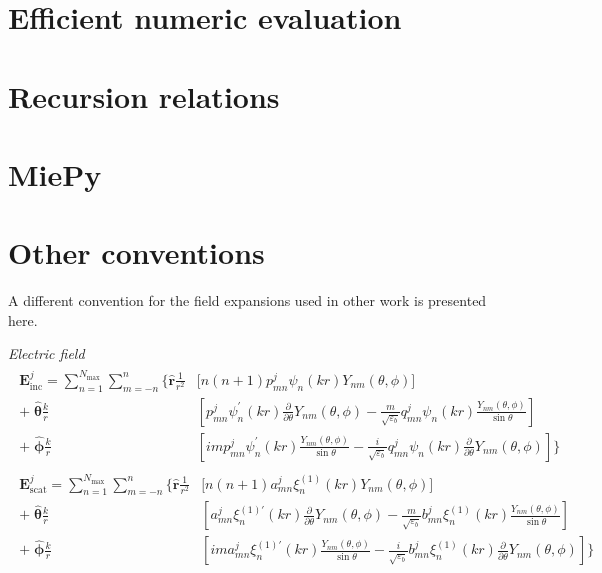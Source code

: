 \documentclass[11pt]{article}
\begin{document}
\section{Efficient numeric evaluation}
\section{Recursion relations}
\section{MiePy}

\section{Other conventions}
A different convention for the field expansions used in other work \cite{barton1989theoretical} is presented here.
\newline

\textit{Electric field}
\begin{align}
\begin{split}
    \boldsymbol{E}_\text{inc}^j = \sum_{n=1}^{N_\text{max}} \sum_{m=-n}^{n} \bigg\{
    \boldsymbol{\hat r}\frac{1}{r^2} &\bigg[ n(n+1) p_{mn}^j \psi_n(kr) Y_{nm}(\theta,\phi) \bigg] \\
    +\; \boldsymbol{\hat \theta}\frac{k}{r} &\left[ p_{mn}^j \psi_n^\prime(kr) \frac{\partial}{\partial \theta} Y_{nm}(\theta,\phi)
    - \frac{m}{\sqrt{\varepsilon_b}} q_{mn}^j \psi_n(kr) \frac{Y_{nm}(\theta,\phi)}{\sin\theta} \right] \\
    +\; \boldsymbol{\hat \phi}\frac{k}{r} &\left[ im p_{mn}^j \psi_n^\prime(kr) \frac{Y_{nm}(\theta,\phi)}{\sin\theta}
    - \frac{i}{\sqrt{\varepsilon_b}} q_{mn}^j \psi_n(kr) \frac{\partial}{\partial \theta} Y_{nm}(\theta,\phi) \right] \bigg\}
\end{split}
\end{align}
\begin{align}
\begin{split}
    \boldsymbol{E}_\text{scat}^j = \sum_{n=1}^{N_\text{max}} \sum_{m=-n}^{n} \bigg\{
    \boldsymbol{\hat r}\frac{1}{r^2} &\bigg[ n(n+1) a_{mn}^j \xi_n^{(1)}(kr) Y_{nm}(\theta,\phi) \bigg] \\
    +\; \boldsymbol{\hat \theta}\frac{k}{r} &\left[ a_{mn}^j \xi_n^{(1)\prime}(kr) \frac{\partial}{\partial \theta} Y_{nm}(\theta,\phi)
    - \frac{m}{\sqrt{\varepsilon_b}} b_{mn}^j \xi_n^{(1)}(kr) \frac{Y_{nm}(\theta,\phi)}{\sin\theta} \right] \\
    +\; \boldsymbol{\hat \phi}\frac{k}{r} &\left[ im a_{mn}^j \xi_n^{(1)\prime}(kr) \frac{Y_{nm}(\theta,\phi)}{\sin\theta}
    - \frac{i}{\sqrt{\varepsilon_b}} b_{mn}^j \xi_n^{(1)}(kr) \frac{\partial}{\partial \theta} Y_{nm}(\theta,\phi) \right] \bigg\}
\end{split}
\end{align}
\end{document}
